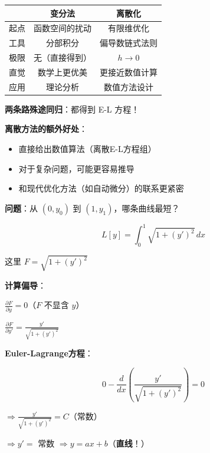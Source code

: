 \documentclass[12pt, a4paper]{ctexart}
\begin{document}
\begin{blackboard}[两种推导方法的比较]

\begin{center}
\begin{tabular}{c|c|c}
& \textbf{变分法} & \textbf{离散化} \\
\hline
起点 & 函数空间的扰动 & 有限维优化 \\
工具 & 分部积分 & 偏导数链式法则 \\
极限 & 无（直接得到） & $h \to 0$ \\
直觉 & 数学上更优美 & 更接近数值计算 \\
应用 & 理论分析 & 数值方法设计
\end{tabular}
\end{center}

\textbf{两条路殊途同归}：都得到 E-L 方程！

\textbf{离散方法的额外好处}：
\begin{itemize}
    \item 直接给出数值算法（离散E-L方程组）
    \item 对于复杂问题，可能更容易推导
    \item 和现代优化方法（如自动微分）的联系更紧密
\end{itemize}

\end{blackboard}

\begin{blackboard}[例1：最短路径]

\textbf{问题}：从 $(0, y_0)$ 到 $(1, y_1)$，哪条曲线最短？

\[
L[y] = \int_0^1 \sqrt{1 + (y')^2} \, dx
\]

这里 $F = \sqrt{1 + (y')^2}$

\textbf{计算偏导}：

$\frac{\partial F}{\partial y} = 0$（$F$ 不显含 $y$）

$\frac{\partial F}{\partial y'} = \frac{y'}{\sqrt{1 + (y')^2}}$

\textbf{Euler-Lagrange方程}：

\[
0 - \frac{d}{dx}\left( \frac{y'}{\sqrt{1 + (y')^2}} \right) = 0
\]

$\Rightarrow \frac{y'}{\sqrt{1 + (y')^2}} = C$（常数）

$\Rightarrow y' = $ 常数 $\Rightarrow y = ax + b$（\textbf{直线}！）

\end{blackboard}
\end{document}
